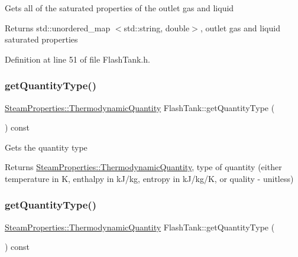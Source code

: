 Gets all of the saturated properties of the outlet gas and liquid \begin{DoxyReturn}{Returns}
std\+::unordered\+\_\+map $<$std\+::string, double$>$, outlet gas and liquid saturated properties 
\end{DoxyReturn}


Definition at line 51 of file Flash\+Tank.\+h.

\mbox{\label{class_flash_tank_a1800317a9b9dd8ff8fb18c693e846a45}} 
\subsubsection{\texorpdfstring{get\+Quantity\+Type()}{getQuantityType()}\hspace{0.1cm}{\footnotesize\ttfamily [1/3]}}
{\footnotesize\ttfamily \hyperlink{class_steam_properties_ae0294bedf7d178c2d8fb6aed0f62fbff}{Steam\+Properties\+::\+Thermodynamic\+Quantity} Flash\+Tank\+::get\+Quantity\+Type (\begin{DoxyParamCaption}{ }\end{DoxyParamCaption}) const}

Gets the quantity type \begin{DoxyReturn}{Returns}
\hyperlink{class_steam_properties_ae0294bedf7d178c2d8fb6aed0f62fbff}{Steam\+Properties\+::\+Thermodynamic\+Quantity}, type of quantity (either temperature in K, enthalpy in k\+J/kg, entropy in k\+J/kg/K, or quality -\/ unitless) 
\end{DoxyReturn}
\mbox{\label{class_flash_tank_a1800317a9b9dd8ff8fb18c693e846a45}} 
\subsubsection{\texorpdfstring{get\+Quantity\+Type()}{getQuantityType()}\hspace{0.1cm}{\footnotesize\ttfamily [2/3]}}
{\footnotesize\ttfamily \hyperlink{class_steam_properties_ae0294bedf7d178c2d8fb6aed0f62fbff}{Steam\+Properties\+::\+Thermodynamic\+Quantity} Flash\+Tank\+::get\+Quantity\+Type (\begin{DoxyParamCaption}{ }\end{DoxyParamCaption}) const}

